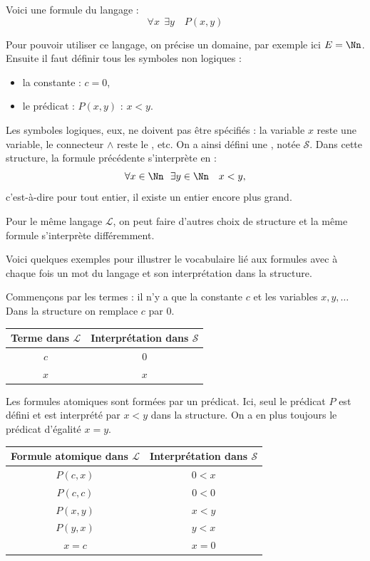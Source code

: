\documentclass[11pt,class=report,crop=false]{standalone}
\begin{document}
Voici une formule du langage :
\[
\forall x \ \ \exists y \quad P(x,y)
\]

Pour pouvoir utiliser ce langage, on précise un domaine, par exemple ici $E = \Nn$. Ensuite il faut définir tous les symboles non logiques :
\begin{itemize}
	\item la constante : $c=0$, 
	
	\item le prédicat : $P(x,y)$ : \og{}$x < y$\fg{}.
\end{itemize}
Les symboles logiques, eux, ne doivent pas être spécifiés : la variable $x$ reste une variable, le connecteur $\land$ reste le \tand, etc.
On a ainsi défini une , notée $\mathcal{S}$.
Dans cette structure, la formule précédente s'interprète en :
\[
\forall x \in \Nn \ \ \exists y \in \Nn \quad x < y,
\]
c'est-à-dire \og{}pour tout entier, il existe un entier encore plus grand\fg{}.

Pour le même langage $\mathcal{L}$, on peut faire d'autres choix de structure et la même formule s'interprète différemment.

\medskip

Voici quelques exemples pour illustrer le vocabulaire lié aux formules avec à chaque fois un mot du langage et son interprétation dans la structure.

Commençons par les termes : il n'y a que la constante $c$ et les variables $x,y,\ldots$ Dans la structure on remplace $c$ par $0$.
\begin{center}
\begin{tabular}{c|c}
	Terme dans $\mathcal{L}$ & Interprétation dans $\mathcal{S}$ \\
	\hline
	$c$ & $0$ \\
	$x$ & $x$ 	
\end{tabular}
\end{center}


Les formules atomiques sont formées par un prédicat. Ici, seul le prédicat $P$ est défini et est interprété par $x<y$ dans la structure. On a en plus toujours le prédicat d'égalité \og{}$x=y$\fg{}.
\begin{center}
\begin{tabular}{c|c}
Formule atomique dans $\mathcal{L}$ & Interprétation dans $\mathcal{S}$ \\
\hline
$P(c,x)$ & $0 < x$ \\
$P(c, c)$ & $0 < 0$ \\
$P(x,y)$ & $x < y$ \\
$P(y,x)$ & $y < x$ \\
$x=c$ & $x=0$ \\
\end{tabular}
\end{center}
\end{document}
